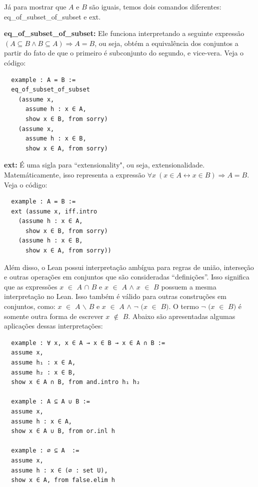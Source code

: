   Já para mostrar que $A$ e $B$ são iguais, temos dois comandos diferentes: {\selectfont eq\_of\_subset\_of\_subset} e {\selectfont ext}.

  \textbf{eq\_of\_subset\_of\_subset:} Ele funciona interpretando a seguinte expressão $(A \subseteq B \wedge B \subseteq A) \Rightarrow A=B$, ou seja, obtém a equivalência dos conjuntos a partir do fato de que o primeiro é subconjunto do segundo, e vice-vera. Veja o código:

  \begin{lstlisting}
  example : A = B :=
  eq_of_subset_of_subset
    (assume x,
      assume h : x ∈ A,
      show x ∈ B, from sorry)
    (assume x,
      assume h : x ∈ B,
      show x ∈ A, from sorry) \end{lstlisting}

  \textbf{ext:} É uma sigla para ``extensionality", ou seja, extensionalidade. Matemáticamente, isso representa a expressão $\forall x \ (x \in A \leftrightarrow x \in B) \Rightarrow A=B$. Veja o código:

  \begin{lstlisting}
  example : A = B :=
  ext (assume x, iff.intro
    (assume h : x ∈ A,
      show x ∈ B, from sorry)
    (assume h : x ∈ B,
      show x ∈ A, from sorry)) \end{lstlisting}

  Além disso, o Lean possui interpretação ambígua para regras de união, interseção e outras operações em conjuntos que são consideradas “definições”. Isso significa que as expressões $x$ $\in$ $A$ $\cap$ $B$ e $x$ $\in$ $A$ $\wedge$ $x$ $\in$ $B$ possuem a mesma interpretação no Lean. Isso também é válido para outras construções em conjuntos, como: $x$ $\in$ $A$ $\backslash $ $B$ e $x$ $\in$ $A$ $\wedge$ $\neg$ $(x$ $\in$ $B)$. O termo $\neg$ $(x$ $\in$ $B)$ é somente outra forma de escrever $x$ $\notin$ $B$. Abaixo são apresentadas algumas aplicações dessas interpretações:

  \begin{lstlisting}
  example : ∀ x, x ∈ A → x ∈ B → x ∈ A ∩ B :=
  assume x,
  assume h₁ : x ∈ A,
  assume h₂ : x ∈ B,
  show x ∈ A ∩ B, from and.intro h₁ h₂

  example : A ⊆ A ∪ B :=
  assume x,
  assume h : x ∈ A,
  show x ∈ A ∪ B, from or.inl h

  example : ∅ ⊆ A  :=
  assume x,
  assume h : x ∈ (∅ : set U),
  show x ∈ A, from false.elim h \end{lstlisting}


